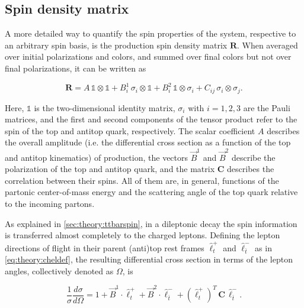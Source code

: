 
\subsection{Spin density matrix}
\label{sec:theory:spindensity}

A more detailed way to quantify the spin properties of the \ttbar system, respective to an arbitrary spin basis, is the production spin density matrix $\mathbf{R}$. When averaged over initial polarizations and colors, and summed over final colors but not over final polarizations, it can be written as~\cite{Maltoni:2024tul,Cheng:2024btk,Anuar:PhD}

\begin{equation}
    \mathbf{R} = A \, \mathbb{1} \otimes \mathbb{1}
    + B_i^1 \, \sigma_i \otimes \mathbb{1}
    + B_i^2 \, \mathbb{1} \otimes \sigma_i
    + C_{ij} \, \sigma_i \otimes \sigma_j.
\end{equation}

Here, $\mathbb{1}$ is the two-dimensional identity matrix, $\sigma_i$ with $i=1,2,3$ are the Pauli matrices, and the first and second components of the tensor product refer to the spin of the top and antitop quark, respectively. The scalar coefficient $A$ describes the overall amplitude (i.e. the differential cross section as a function of the top and antitop kinematics) of \ttbar production, the vectors $\vec{B}^1$ and $\vec{B}^2$ describe the polarization of the top and antitop quark, and the matrix $\mathbf{C}$ describes the correlation between their spins. All of them are, in general, functions of the partonic center-of-mass energy and the scattering angle of the top quark relative to the incoming partons.

As explained in \cref{sec:theory:ttbarspin}, in a dileptonic decay the spin information is transferred almost completely to the charged leptons. Defining the lepton directions of flight in their parent (anti)top rest frames $\hat{\ell}_t^+$ and $\hat{\ell}_{\bar{t}}^-$ as in \cref{eq:theory:cheldef}, the resulting differential cross section in terms of the lepton angles, collectively denoted as $\Omega$, is~\cite{Anuar:PhD}

\begin{equation}
    \frac{1}{\sigma} \frac{d \sigma}{d \Omega} = 1 + \vec{B}^1 \cdot \hat{\ell}_t^+ + \vec{B}^2 \cdot \hat{\ell}_{\bar{t}}^- + (\hat{\ell}_t^+)^T \, \mathbf{C} \, \hat{\ell}_{\bar{t}}^- .
\end{equation}

